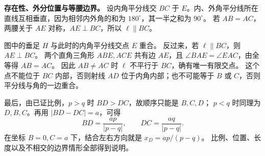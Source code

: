 \begin{proofbox}
\tcbbreak
\textbf{存在性、外分位置与等腰边界。}
设内角平分线交 $BC$ 于 $E$。内、外角平分线所在直线互相垂直，因为相邻内外角的和为 $180^\circ$，其一半之和为 $90^\circ$。
若 $AB=AC$，两腰关于 $AE$ 对称，$AE\perp BC$，所以 $\ell\parallel BC$。

图中的垂足 $H$ 与此时的内角平分线交点 $E$ 重合。
反过来，若 $\ell\parallel BC$，则 $AE\perp BC$。
两个直角三角形 $ABE,ACE$ 共有边 $AE$，且 $\angle BAE=\angle EAC$，由全等得 $AB=AC$。
因此 $AB\ne AC$ 时 $\ell$ 不平行于 $BC$，确有唯一有限交点。
这个点不能位于 $BC$ 内部，否则射线 $AD$ 位于内角内部；也不可能等于 $B$ 或 $C$，否则平分线与角的一边重合。

最后，由已证比例，$p>q$ 时 $BD>DC$，故顺序只能是 $B,C,D$；
$p<q$ 时同理为 $D,B,C$。再用 $|BD-DC|=a$，可得
\[
 BD=\frac{ap}{|p-q|},\qquad DC=\frac{aq}{|p-q|}.
\]
在坐标 $B=0,C=a$ 下，结合左右方向就是 $x_D=ap/(p-q)$。
比例、位置、长度以及不相交的边界情形全部得到说明。
\end{proofbox}
